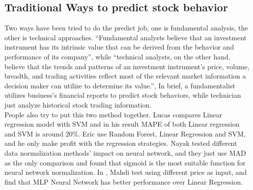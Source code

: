\subsection{Traditional Ways to predict stock behavior}

Two ways have been tried to do the predict job, one is fundamental analysis, the other is technical approaches\cite{1_edwardsmagee_1997}. “Fundamental analysts believe that an investment instrument has its intrinsic value that can be derived from the behavior and performance of its company”, while “technical analysts, on the other hand, believe that the trends and patterns of an investment instrument’s price, volume, breadth, and trading activities reflect most of the relevant market information a decision maker can utilize to determine its value.”\cite{lam2004neural}, In brief, a fundamentalist utilizes business’s financial reports to predict stock behaviors, while technician just analyze historical stock trading information.\\

People also try to put this two method together. Lucas\cite{nunnostock} compares Linear regression model with SVM and in his result MAPE of both Linear regression and SVM is around 20\%. Eric\cite{alexanderstock} use Random Forest, Linear Regression and SVM, and he only make profit with the regression strategies. Nayak\cite{nayak2014impact} tested different data normalization methods’ impact on neural network, and they just use MAD as the only comparison and found that sigmoid is the most suitable function for neural network normalization. In \cite{naeini2010stock}, Mahdi test using different price as input, and find that MLP Neural Network has better performance over Linear Regression.

